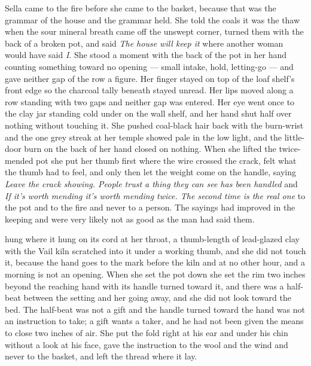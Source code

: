 \scenebreak

Sella came to the fire before she came to the basket, because that was the grammar of the house and the grammar held. She told the coals it was the thaw when the sour mineral breath came off the unswept corner, turned them with the back of a broken pot, and said \emph{The house will keep it} where another woman would have said \emph{I}. She stood a moment with the back of the pot in her hand counting something toward no opening --- small intake, hold, letting-go --- and gave neither gap of the row a figure. Her finger stayed on top of the loaf shelf's front edge so the charcoal tally beneath stayed unread. Her lips moved along a row standing with two gaps and neither gap was entered. Her eye went once to the clay jar standing cold under  on the wall shelf, and her hand shut half over nothing without touching it. She pushed coal-black hair back with the burn-wrist and the one grey streak at her temple showed pale in the low light, and the little-door burn on the back of her hand closed on nothing. When she lifted the twice-mended pot she put her thumb first where the wire crossed the crack, felt what the thumb had to feel, and only then let the weight come on the handle, saying \emph{Leave the crack showing. People trust a thing they can see has been handled} and \emph{If it's worth mending it's worth mending twice. The second time is the real one} to the pot and to the fire and never to a person. The sayings had improved in the keeping and were very likely not as good as the man had said them.

 hung where it hung on its cord at her throat, a thumb-length of lead-glazed clay with the Vail kiln scratched into it under a working thumb, and she did not touch it, because the hand goes to the mark before the kiln and at no other hour, and a morning is not an opening. When she set the pot down she set the rim two inches beyond the reaching hand with its handle turned toward it, and there was a half-beat between the setting and her going away, and she did not look toward the bed. The half-beat was not a gift and the handle turned toward the hand was not an instruction to take; a gift wants a taker, and he had not been given the means to close two inches of air. She put the fold right at his ear and under his chin without a look at his face, gave the instruction to the wool and the wind and never to the basket, and left the thread where it lay.

